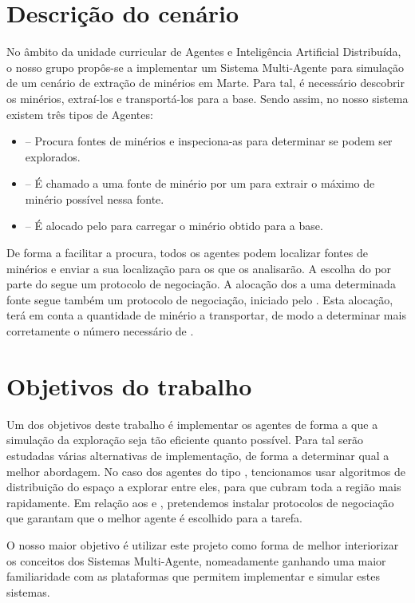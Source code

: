 \documentclass[12pt]{report}
\begin{document}
\section{Descrição do cenário}
No âmbito da unidade curricular de Agentes e Inteligência Artificial Distribuída, o nosso grupo propôs-se a implementar um Sistema Multi-Agente para simulação de um cenário de extração de minérios em Marte. Para tal, é necessário descobrir os minérios, extraí-los e transportá-los para a base. Sendo assim, no nosso sistema existem três tipos de Agentes:

\begin{itemize}
	\item \Spotter – Procura fontes de minérios e inspeciona-as para determinar se podem ser explorados. 
	\item \Producer – É chamado a uma fonte de minério por um \spotter para extrair o máximo de minério possível nessa fonte. 
	\item \Transporter – É alocado pelo \producer para carregar o minério obtido para a base.
\end{itemize}

De forma a facilitar a procura, todos os agentes podem localizar fontes de minérios e enviar a sua localização para os \spotters que os analisarão. A escolha do \producer por parte do \spotter segue um protocolo de negociação. A alocação dos \transporters a uma determinada fonte segue também um protocolo de negociação, iniciado pelo \producer. Esta alocação, terá em conta a quantidade de minério a transportar, de modo a determinar mais corretamente o número necessário de \transporters.

\section{Objetivos do trabalho}

Um dos objetivos deste trabalho é implementar os agentes de forma a que a simulação da exploração seja tão eficiente quanto possível. Para tal serão estudadas várias alternativas de implementação, de forma a determinar qual a melhor abordagem. No caso dos agentes do tipo \spotter, tencionamos usar algoritmos de distribuição do espaço a explorar entre eles, para que cubram toda a região mais rapidamente. Em relação aos \producers e \transporters, pretendemos instalar protocolos de negociação que garantam que o melhor agente é escolhido para a tarefa.

O nosso maior objetivo é utilizar este projeto como forma de melhor interiorizar os conceitos dos Sistemas Multi-Agente, nomeadamente ganhando uma maior familiaridade com as plataformas que permitem implementar e simular estes sistemas.
\end{document}
